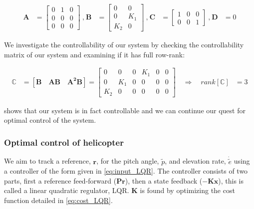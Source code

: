 \begin{equation}\label{eq:sysMatrices}
    \begin{aligned}
        \mathbf{A} &=
        \begin{bmatrix}
            0 & 1 & 0 \\
            0 & 0 & 0 \\
            0 & 0 & 0 
        \end{bmatrix}
        \: \textrm{,} \:
        \mathbf{B} &=
        \begin{bmatrix}
            0 & 0 \\
            0 & K_1 \\
            K_2 & 0
        \end{bmatrix}
        \: \textrm{,} \:
        \mathbf{C} &=
        \begin{bmatrix}
            1 & 0 & 0 \\
            0 & 0 & 1
        \end{bmatrix}
        \: \textrm{,} \:
        \mathbf{D} &= 0
    \end{aligned}
\end{equation}

We investigate the controllability of our system by checking the controllability matrix of our system\cite{Chen2014} and examining if it has full row-rank:

\begin{equation}\label{eq:ctrl_sys}
    \begin{aligned}
    \mathbb{C} &= 
    [\mathbf{B}\quad \mathbf{AB}\quad \mathbf{A^2B}] = 
    \begin{bmatrix}
        0 & 0   & 0 & K_1 & 0 & 0 \\
        0 & K_1 & 0 & 0   & 0 & 0 \\
        K_2 & 0 & 0 & 0   & 0 & 0
    \end{bmatrix}
    \quad\Rightarrow \quad
    rank[\mathbb{C}] &= 3
    \end{aligned}
\end{equation}

 shows that our system is in fact controllable and we can continue our quest for optimal control of the system.

\subsubsection{Optimal control of helicopter}
We aim to track a reference, $\mathbf{r}$, for the pitch angle, $\tilde{p}$, and elevation rate, $\dot{\tilde{e}}$ using a controller of the form given in \cref{eq:input_LQR}. The controller consists of two parts, first a reference feed-forward ($\mathbf{Pr}$), then a state feedback ($\mathbf{-Kx}$), this is called a linear quadratic regulator, LQR\cite{Chen2014}. $\mathbf{K}$ is found by optimizing the cost function detailed in \cref{eq:cost_LQR}.

